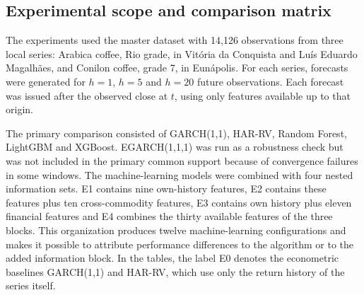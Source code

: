 \documentclass[a4paper,fleqn]{cas-sc}
\begin{document}
\subsection{Experimental scope and comparison matrix}
\label{subsec:experimental_scope}

The experiments used the master dataset with 14,126 observations from three local series: Arabica coffee, Rio grade, in Vitória da Conquista and Luís Eduardo Magalhães, and Conilon coffee, grade 7, in Eunápolis. For each series, forecasts were generated for \(h=1\), \(h=5\) and \(h=20\) future observations. Each forecast was issued after the observed close at \(t\), using only features available up to that origin.

The primary comparison consisted of GARCH(1,1), HAR-RV, Random Forest, LightGBM and XGBoost. EGARCH(1,1,1) was run as a robustness check but was not included in the primary common support because of convergence failures in some windows. The machine-learning models were combined with four nested information sets. E1 contains nine own-history features, E2 contains these features plus ten cross-commodity features, E3 contains own history plus eleven financial features and E4 combines the thirty available features of the three blocks. This organization produces twelve machine-learning configurations and makes it possible to attribute performance differences to the algorithm or to the added information block. In the tables, the label E0 denotes the econometric baselines GARCH(1,1) and HAR-RV, which use only the return history of the series itself.
\end{document}
